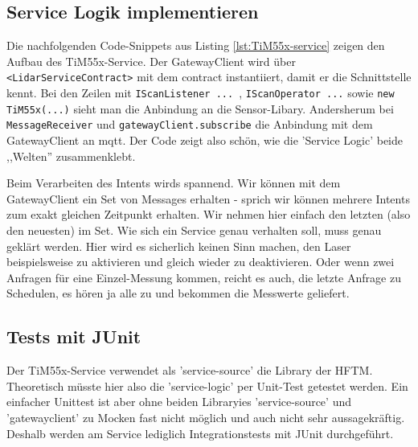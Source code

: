 \subsection{Service Logik implementieren}
Die nachfolgenden Code-Snippets aus Listing \ref{lst:TiM55x-service} zeigen den Aufbau des TiM55x-Service. Der GatewayClient wird über \verb|<LidarServiceContract>| mit dem \Gls{contract} instantiiert, damit er die Schnittstelle kennt. Bei den Zeilen mit \verb|IScanListener ... |, \verb|IScanOperator ...| sowie \verb|new TiM55x(...)| sieht man die Anbindung an die Sensor-Libary. Andersherum bei \verb|MessageReceiver| und \verb|gatewayClient.subscribe| die Anbindung mit dem GatewayClient an \acrshort{mqtt}. Der Code zeigt also schön, wie die 'Service Logic' beide ,,Welten'' zusammenklebt.

Beim Verarbeiten des Intents wirds spannend. Wir können mit dem GatewayClient ein Set von Messages erhalten - sprich wir können mehrere Intents zum exakt gleichen Zeitpunkt erhalten. Wir nehmen hier einfach den letzten (also den neuesten) im Set. Wie sich ein Service genau verhalten soll, muss genau geklärt werden. Hier wird es sicherlich keinen Sinn machen, den Laser beispielsweise zu aktivieren und gleich wieder zu deaktivieren. Oder wenn zwei Anfragen für eine Einzel-Messung kommen, reicht es auch, die letzte Anfrage zu Schedulen, es hören ja alle zu und bekommen die Messwerte geliefert.

\subsection{Tests mit JUnit}
Der TiM55x-Service verwendet als '\Gls{service-source}' die Library der HFTM. Theoretisch müsste hier also die '\Gls{service-logic}' per Unit-Test getestet werden. Ein einfacher Unittest ist aber ohne beiden Libraryies '\Gls{service-source}' und '\Gls{gatewayclient}' zu Mocken fast nicht möglich und auch nicht sehr aussagekräftig. Deshalb werden am Service lediglich Integrationstests mit JUnit durchgeführt.
